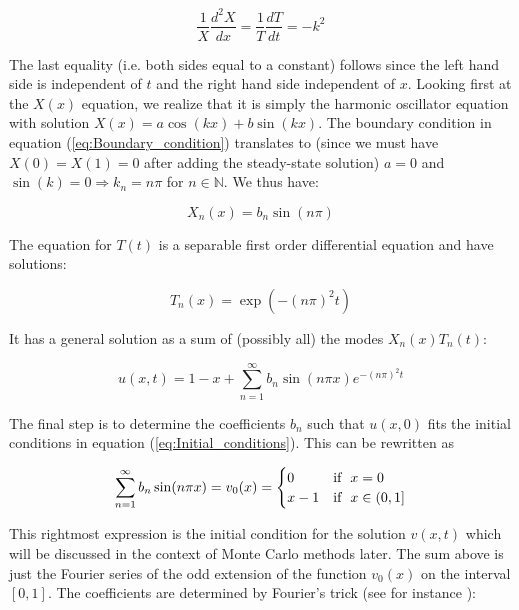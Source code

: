 \documentclass[a4paper, 11pt, notitlepage,english]{article}
\begin{document}
\begin{equation}
\frac{1}{X} \frac{d^2 X}{dx} = \frac{1}{T}\frac{dT}{dt} = -k^2
\label{eq:Separated_equation}
\end{equation}

The last equality (i.e. both sides equal to a constant) follows since the left hand side is independent of $t$ and the right hand side independent of $x$. Looking first at the $X(x)$ equation, we realize that it is simply the harmonic oscillator equation with solution $X(x) = a\cos(kx) + b\sin(kx)$. The boundary condition in equation (\ref{eq:Boundary_condition}) translates to (since we must have $X(0) = X(1) = 0$ after adding the steady-state solution) $a = 0$ and $\sin(k) = 0 \Rightarrow k_n = n\pi$ for $n \in \mathbb{N}$. We thus have:

\begin{equation}
X_n(x) = b_n \sin(n\pi)
\label{eq:Separated_X_solution}
\end{equation}

The equation for $T(t)$ is a separable first order differential equation and have solutions:

\begin{equation}
T_n(x) = \exp(-(n\pi)^2t)
\label{eq:Separated_T_solution}
\end{equation}

It has a general solution as a sum of (possibly all) the modes $X_n(x)T_n(t)$:

\begin{equation}
u(x,t) = 1-x +\sum_{n=1}^{\infty} b_n \sin(n\pi x) e^{-(n\pi)^2t}
\label{eq:General_solution}
\end{equation}

The final step is to determine the coefficients $b_n$ such that $u(x,0)$ fits the initial conditions in equation (\ref{eq:Initial_conditions}). This can be rewritten as 

\begin{equation}
\sum_{n=1}^{\infty} b_n \sin(n\pi x) = v_0(x) =  \begin{cases} 0 & \mathrm{if} \hspace{2mm} x = 0 \\
x-1 & \mathrm{if} \hspace{2mm} x \in (0,1] \end{cases}
\label{eq:Initial_cond_fit}
\end{equation}

This rightmost expression is the initial condition for the solution $v(x,t)$ which will be discussed in the context of Monte Carlo methods later. The sum above is just the Fourier series of the odd extension of the function $v_0(x)$ on the interval $[0,1]$. The coefficients are determined by Fourier's trick (see for instance \cite{Boas}):
\end{document}
